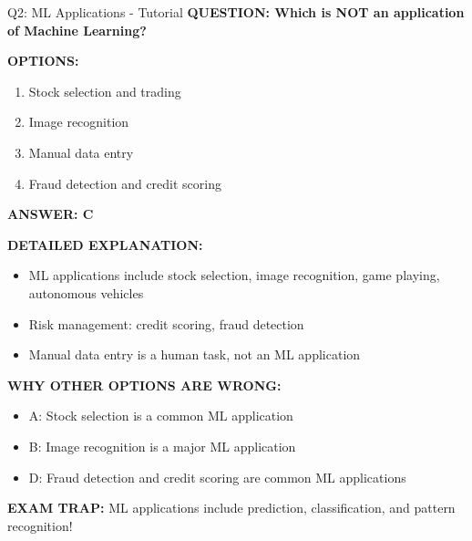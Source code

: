 \documentclass[8pt]{beamer}
\begin{document}
	\begin{frame}{Q2: ML Applications - Tutorial}
		\fontsize{6.5}{7.5}\selectfont
		\textbf{QUESTION: Which is NOT an application of Machine Learning?}
		
		\vspace{0.1cm}
		\textbf{OPTIONS:}
		\begin{enumerate}
			\item Stock selection and trading
			\item Image recognition
			\item Manual data entry
			\item Fraud detection and credit scoring
		\end{enumerate}
		
		\vspace{0.1cm}
		\textcolor{myblue}{\textbf{ANSWER: C}}
		
		\vspace{0.1cm}
		\textbf{DETAILED EXPLANATION:}
		\begin{itemize}
			\item ML applications include stock selection, image recognition, game playing, autonomous vehicles
			\item Risk management: credit scoring, fraud detection
			\item Manual data entry is a human task, not an ML application
		\end{itemize}
		
		\vspace{0.1cm}
		\textcolor{myred}{\textbf{WHY OTHER OPTIONS ARE WRONG:}}
		\begin{itemize}
			\item \textcolor{myred}{A:} Stock selection is a common ML application
			\item \textcolor{myred}{B:} Image recognition is a major ML application
			\item \textcolor{myred}{D:} Fraud detection and credit scoring are common ML applications
		\end{itemize}
		
		\textcolor{myred}{\textbf{EXAM TRAP:}} ML applications include \textcolor{myblue}{prediction, classification, and pattern recognition}!
	\end{frame}
	
\end{document}
